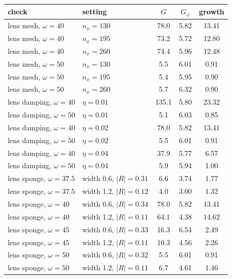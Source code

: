 \begin{tabular}{@{}llccc@{}}
\toprule
check & setting & $G$ & $G_\varphi$ & growth\\ \midrule
lens mesh, $\omega=40$ & $n_x=130$ & 78.0 & 5.82 & 13.41\\
lens mesh, $\omega=40$ & $n_x=195$ & 73.2 & 5.72 & 12.80\\
lens mesh, $\omega=40$ & $n_x=260$ & 74.4 & 5.96 & 12.48\\
lens mesh, $\omega=50$ & $n_x=130$ & 5.5 & 6.01 & 0.91\\
lens mesh, $\omega=50$ & $n_x=195$ & 5.4 & 5.95 & 0.90\\
lens mesh, $\omega=50$ & $n_x=260$ & 5.7 & 6.32 & 0.90\\
\midrule
lens damping, $\omega=40$ & $\eta=0.01$ & 135.1 & 5.80 & 23.32\\
lens damping, $\omega=50$ & $\eta=0.01$ & 5.1 & 6.03 & 0.85\\
lens damping, $\omega=40$ & $\eta=0.02$ & 78.0 & 5.82 & 13.41\\
lens damping, $\omega=50$ & $\eta=0.02$ & 5.5 & 6.01 & 0.91\\
lens damping, $\omega=40$ & $\eta=0.04$ & 37.9 & 5.77 & 6.57\\
lens damping, $\omega=50$ & $\eta=0.04$ & 5.9 & 5.94 & 1.00\\
\midrule
lens sponge, $\omega=37.5$ & width 0.6, $|R|=0.31$ & 6.6 & 3.74 & 1.77\\
lens sponge, $\omega=37.5$ & width 1.2, $|R|=0.12$ & 4.0 & 3.00 & 1.32\\
lens sponge, $\omega=40$ & width 0.6, $|R|=0.34$ & 78.0 & 5.82 & 13.41\\
lens sponge, $\omega=40$ & width 1.2, $|R|=0.11$ & 64.1 & 4.38 & 14.62\\
lens sponge, $\omega=45$ & width 0.6, $|R|=0.33$ & 16.3 & 6.54 & 2.49\\
lens sponge, $\omega=45$ & width 1.2, $|R|=0.11$ & 10.3 & 4.56 & 2.26\\
lens sponge, $\omega=50$ & width 0.6, $|R|=0.32$ & 5.5 & 6.01 & 0.91\\
lens sponge, $\omega=50$ & width 1.2, $|R|=0.11$ & 6.7 & 4.61 & 1.46\\
\bottomrule
\end{tabular}
